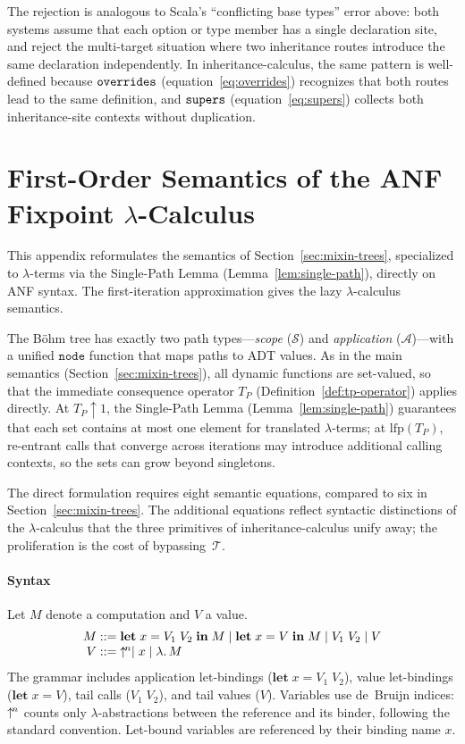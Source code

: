The rejection is analogous to Scala's ``conflicting base types''
error above: both systems assume that each option or type member
has a single declaration site, and reject the multi-target situation
where two inheritance routes introduce the same declaration
independently.
In inheritance-calculus, the same pattern is well-defined because
$\mathtt{overrides}$ (equation~\ref{eq:overrides}) recognizes that both
routes lead to the same definition, and $\mathtt{supers}$
(equation~\ref{eq:supers}) collects both inheritance-site
contexts without duplication.

\section{First-Order Semantics of the ANF Fixpoint
\texorpdfstring{$\lambda$}{λ}-Calculus}
\label{app:lambda-fixpoint}

This appendix reformulates the semantics of
Section~\ref{sec:mixin-trees}, specialized to $\lambda$-terms via
the Single-Path Lemma (Lemma~\ref{lem:single-path}), directly on
ANF syntax. The first-iteration approximation gives the lazy
$\lambda$-calculus semantics.

The B\"ohm tree has exactly two path types---\emph{scope}
($\mathcal{S}$) and \emph{application}
($\mathcal{A}$)---with a unified $\mathtt{node}$ function
that maps paths to ADT values.
As in the main semantics (Section~\ref{sec:mixin-trees}),
all dynamic functions are set-valued, so that the
immediate consequence operator $T_P$
(Definition~\ref{def:tp-operator}) applies directly.
At $T_P\!\uparrow\!1$, the Single-Path Lemma
(Lemma~\ref{lem:single-path}) guarantees that each set
contains at most one element for translated
$\lambda$-terms; at $\mathrm{lfp}(T_P)$, re-entrant
calls that converge across iterations may introduce
additional calling contexts, so the sets can grow beyond
singletons.

The direct formulation requires eight semantic equations,
compared to six in Section~\ref{sec:mixin-trees}.
The additional equations reflect syntactic distinctions
of the $\lambda$-calculus that the three primitives of
inheritance-calculus unify away;
the proliferation is the cost of bypassing~$\mathcal{T}$.

\paragraph{Syntax}
Let $M$ denote a computation and $V$ a value.
\[
  \begin{array}{r@{\;::=\;}l}
    M & \mathbf{let}\; x = V_1\; V_2 \;\mathbf{in}\; M
    \mid \mathbf{let}\; x = V \;\mathbf{in}\; M
    \mid V_1\; V_2
    \mid V \\
    V & \dbi{n} \mid x \mid \lambda.\, M
  \end{array}
\]
The grammar includes application let-bindings
($\mathbf{let}\; x = V_1\; V_2$),
value let-bindings ($\mathbf{let}\; x = V$),
tail calls ($V_1\; V_2$), and tail values ($V$).
Variables use de~Bruijn indices: $\uparrow^{\!n}$ counts only
$\lambda$-abstractions between the reference and its binder,
following the standard convention.
Let-bound variables are referenced by their binding name $x$.

